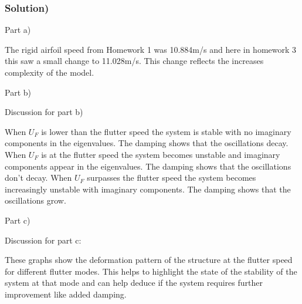 \documentclass[11pt]{article}
\begin{document}
\subsubsection{Solution)}\label{solution-4}

Part a)

The rigid airfoil speed from Homework 1 was 10.884m/s and here in
homework 3 this saw a small change to 11.028m/s. This change reflects
the increases complexity of the model.

Part b)

Discussion for part b)

When \(U_{F}\) is lower than the flutter speed the system is stable with
no imaginary components in the eigenvalues. The damping shows that the
oscillations decay. When \(U_{F}\) is at the flutter speed the system
becomes unstable and imaginary components appear in the eigenvalues. The
damping shows that the oscillations don't decay. When \(U_{F}\)
surpasses the flutter speed the system becomes increasingly unstable
with imaginary components. The damping shows that the oscillations grow.

Part c)

Discussion for part c:

These graphs show the deformation pattern of the structure at the
flutter speed for different flutter modes. This helps to highlight the
state of the stability of the system at that mode and can help deduce if
the system requires further improvement like added damping.
\end{document}
